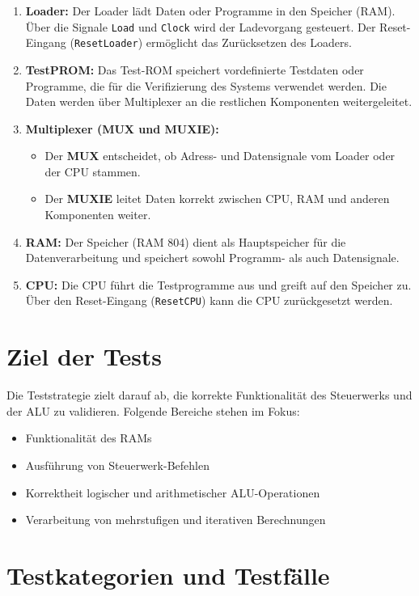 \begin{enumerate}
    \item \textbf{Loader:} Der Loader lädt Daten oder Programme in den Speicher (RAM). Über die Signale \texttt{Load} und \texttt{Clock} wird der Ladevorgang gesteuert. Der Reset-Eingang (\texttt{ResetLoader}) ermöglicht das Zurücksetzen des Loaders.
    \item \textbf{TestPROM:} Das Test-ROM speichert vordefinierte Testdaten oder Programme, die für die Verifizierung des Systems verwendet werden. Die Daten werden über Multiplexer an die restlichen Komponenten weitergeleitet.
    \item \textbf{Multiplexer (MUX und MUXIE):}
          \begin{itemize}
              \item Der \textbf{MUX} entscheidet, ob Adress- und Datensignale vom Loader oder der CPU stammen.
              \item Der \textbf{MUXIE} leitet Daten korrekt zwischen CPU, RAM und anderen Komponenten weiter.
          \end{itemize}
    \item \textbf{RAM:} Der Speicher (RAM 804) dient als Hauptspeicher für die Datenverarbeitung und speichert sowohl Programm- als auch Datensignale.
    \item \textbf{CPU:} Die CPU führt die Testprogramme aus und greift auf den Speicher zu. Über den Reset-Eingang (\texttt{ResetCPU}) kann die CPU zurückgesetzt werden.
\end{enumerate}

\section{Ziel der Tests}
Die Teststrategie zielt darauf ab, die korrekte Funktionalität des Steuerwerks und der ALU zu validieren. Folgende Bereiche stehen im Fokus:
\begin{itemize}
    \item Funktionalität des RAMs
    \item Ausführung von Steuerwerk-Befehlen
    \item Korrektheit logischer und arithmetischer ALU-Operationen
    \item Verarbeitung von mehrstufigen und iterativen Berechnungen
\end{itemize}

\section{Testkategorien und Testfälle}

